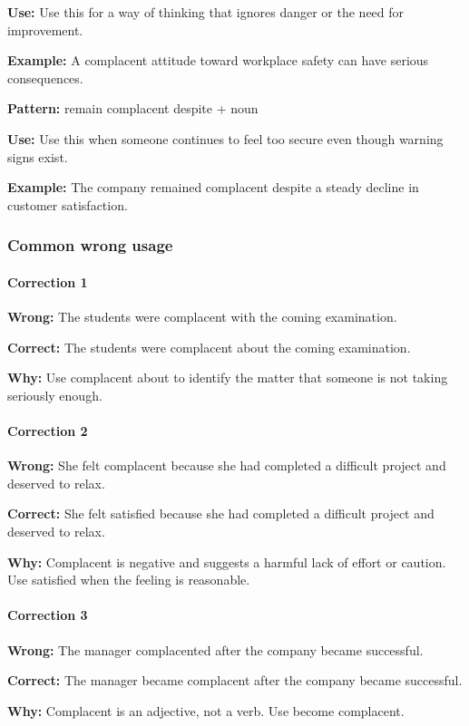 \documentclass[11pt]{article}
\begin{document}
\textbf{Use:} Use this for a way of thinking that ignores danger or the need for improvement.

\textbf{Example:} A complacent attitude toward workplace safety can have serious consequences.

\textbf{Pattern:} remain complacent despite + noun

\textbf{Use:} Use this when someone continues to feel too secure even though warning signs exist.

\textbf{Example:} The company remained complacent despite a steady decline in customer satisfaction.

\subsubsection{Common wrong usage}
\paragraph{Correction 1}
\textbf{Wrong:} The students were complacent with the coming examination.

\textbf{Correct:} The students were complacent about the coming examination.

\textbf{Why:} Use complacent about to identify the matter that someone is not taking seriously enough.

\paragraph{Correction 2}
\textbf{Wrong:} She felt complacent because she had completed a difficult project and deserved to relax.

\textbf{Correct:} She felt satisfied because she had completed a difficult project and deserved to relax.

\textbf{Why:} Complacent is negative and suggests a harmful lack of effort or caution. Use satisfied when the feeling is reasonable.

\paragraph{Correction 3}
\textbf{Wrong:} The manager complacented after the company became successful.

\textbf{Correct:} The manager became complacent after the company became successful.

\textbf{Why:} Complacent is an adjective, not a verb. Use become complacent.
\end{document}
